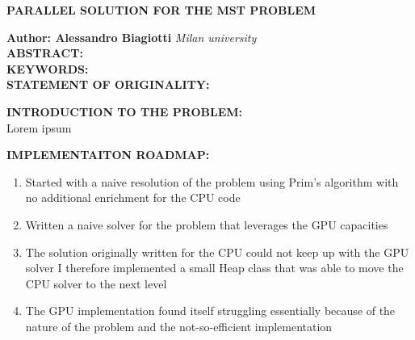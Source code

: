 \documentclass[a4paper,10pt]{article}
\begin{document}
\noindent
\begin{center}
	\textbf{{PARALLEL SOLUTION FOR THE MST PROBLEM}} \\
\end{center}

\noindent
\textbf{Author: Alessandro Biagiotti} \hfill \textit{Milan university}
\\


\noindent
\textbf{ABSTRACT:}
\\

\noindent
\textbf{KEYWORDS:}
\\

\noindent
\textbf{STATEMENT OF ORIGINALITY:}

\noindent
{}
\makeatletter\def\@currentlabel{\texttt{(I)}}\makeatother
\label{sec:intro}
\textbf{INTRODUCTION TO THE PROBLEM:}
\\
Lorem ipsum

\noindent
{}
\makeatletter\def\@currentlabel{\texttt{(I)}}\makeatother
\label{sec:intro}
\textbf{IMPLEMENTAITON ROADMAP:}
\\
\begin{enumerate}
	\item Started with a naive resolution of the problem using Prim's algorithm with no additional enrichment for the CPU code
	\item Written a naive solver for the problem that leverages the GPU capacities
	\item The solution originally written for the CPU could not keep up with the GPU solver I therefore implemented a small Heap class that was able to move the CPU solver to the next level
	\item The GPU implementation found itself struggling essentially because of the nature of the problem and the not-so-efficient implementation
\end{enumerate}

\printbibliography

\clearpage
\end{document}
